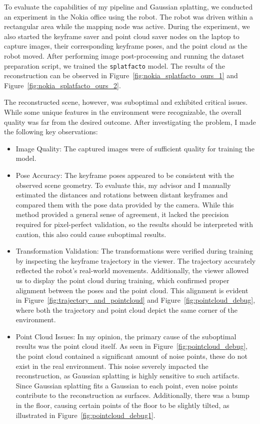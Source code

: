 To evaluate the capabilities of my pipeline and Gaussian splatting, we conducted an experiment in the Nokia office using the robot. The robot was driven within a rectangular area while the mapping node was active. During the experiment, we also started the keyframe saver and point cloud saver nodes on the laptop to capture images, their corresponding keyframe poses, and the point cloud as the robot moved. After performing image post-processing and running the dataset preparation script, we trained the \verb|splatfacto| model. The results of the reconstruction can be observed in Figure~\ref{fig:nokia_splatfacto_ours_1} and Figure~\ref{fig:nokia_splatfacto_ours_2}.

The reconstructed scene, however, was suboptimal and exhibited critical issues. While some unique features in the environment were recognizable, the overall quality was far from the desired outcome. After investigating the problem, I made the following key observations:

\begin{itemize}
    \item Image Quality: The captured images were of sufficient quality for training the model.
    \item Pose Accuracy: The keyframe poses appeared to be consistent with the observed scene geometry. To evaluate this, my advisor and I manually estimated the distances and rotations between distant keyframes and compared them with the pose data provided by the camera. While this method provided a general sense of agreement, it lacked the precision required for pixel-perfect validation, so the results should be interpreted with caution, this also could cause suboptimal results.
    \item Transformation Validation: The transformations were verified during training by inspecting the keyframe trajectory in the viewer. The trajectory accurately reflected the robot's real-world movements. Additionally, the viewer allowed us to display the point cloud during training, which confirmed proper alignment between the poses and the point cloud. This alignment is evident in Figure~\ref{fig:trajectory_and_pointcloud} and Figure~\ref{fig:pointcloud_debug}, where both the trajectory and point cloud depict the same corner of the environment.
    \item Point Cloud Issues: In my opinion, the primary cause of the suboptimal results was the point cloud itself. As seen in Figure~\ref{fig:pointcloud_debug}, the point cloud contained a significant amount of noise points, these do not exist in the real environment. This noise severely impacted the reconstruction, as Gaussian splatting is highly sensitive to such artifacts. Since Gaussian splatting fits a Gaussian to each point, even noise points contribute to the reconstruction as surfaces. Additionally, there was a bump in the floor, causing certain points of the floor to be slightly tilted, as illustrated in Figure~\ref{fig:pointcloud_debug1}.
\end{itemize}

